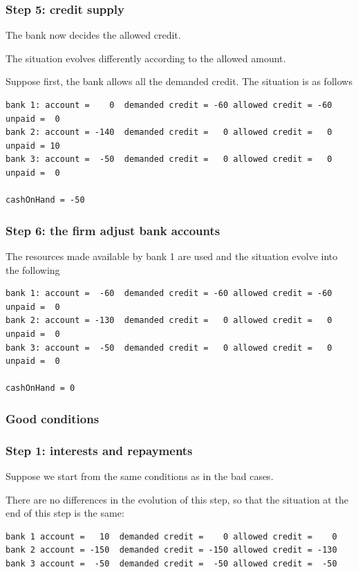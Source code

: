 \documentclass{article}
\begin{document}
\subsubsection*{Step 5: credit supply}

The bank now decides the allowed credit.

The situation evolves differently according to the allowed amount.

Suppose first, the bank allows all the demanded credit. The situation is as follows

\begin{verbatim}
bank 1: account =    0  demanded credit = -60 allowed credit = -60 unpaid =  0
bank 2: account = -140  demanded credit =   0 allowed credit =   0 unpaid = 10
bank 3: account =  -50  demanded credit =   0 allowed credit =   0 unpaid =  0

cashOnHand = -50
\end{verbatim}

\subsubsection*{Step 6: the firm adjust bank accounts}

The resources made available by bank 1 are used and the situation evolve into the following

\begin{verbatim}
bank 1: account =  -60  demanded credit = -60 allowed credit = -60 unpaid =  0
bank 2: account = -130  demanded credit =   0 allowed credit =   0 unpaid =  0
bank 3: account =  -50  demanded credit =   0 allowed credit =   0 unpaid =  0

cashOnHand = 0
\end{verbatim}

\subsubsection{Good conditions}
	\subsubsection*{Step 1: interests and repayments}
	Suppose we start from the same conditions as in the bad cases.

	There are no differences in the evolution of this step, so that the situation at the end of this step is the same:
\begin{verbatim}
bank 1 account =   10  demanded credit =    0 allowed credit =    0
bank 2 account = -150  demanded credit = -150 allowed credit = -130 
bank 3 account =  -50  demanded credit =  -50 allowed credit =  -50
\end{verbatim}
\end{document}
